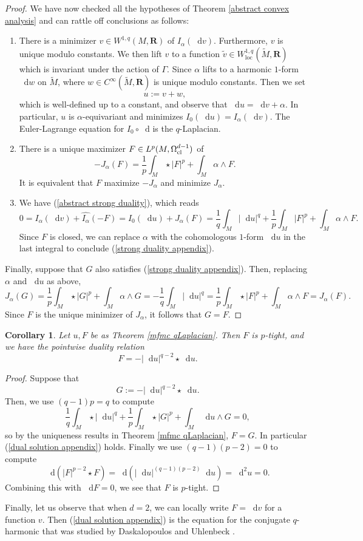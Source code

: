 \documentclass[reqno,11pt]{amsart}
\newcommand{\RR}{\mathbf{R}}
\newcommand*\dif{\mathop{}\!\mathrm{d}}
\newcommand{\loc}{\mathrm{loc}}
\newtheorem{corollary}[theorem]{Corollary}
\theoremstyle{definition}
\numberwithin{equation}{section}
\begin{document}
\begin{proof}
We have now checked all the hypotheses of Theorem \ref{abstract convex analysis} and can rattle off conclusions as follows:
\begin{enumerate}
\item There is a minimizer $v \in W^{1, q}(M, \RR)$ of $I_\alpha(\dif v)$. Furthermore, $v$ is unique modulo constants.
We then lift $v$ to a function $\tilde v \in W^{1, q}_\loc(\tilde M, \RR)$ which is invariant under the action of $\Gamma$.
Since $\alpha$ lifts to a harmonic $1$-form $\dif w$ on $\tilde M$, where $w \in C^\infty(\tilde M, \RR)$ is unique modulo constants.
Then we set 
$$u := v + w,$$
which is well-defined up to a constant, and observe that $\dif u = \dif v + \alpha$.
In particular, $u$ is $\alpha$-equivariant and minimizes $I_0(\dif u) = I_\alpha(\dif v)$.
The Euler-Lagrange equation for $I_0 \circ \dif$ is the $q$-Laplacian.
\item There is a unique maximizer $F \in L^p(M, \Omega^{d - 1}_{\rm cl})$ of
$$-J_\alpha(F) = \frac{1}{p} \int_M \star |F|^p + \int_M \alpha \wedge F.$$
It is equivalent that $F$ maximize $-J_\alpha$ and minimize $J_\alpha$.
\item We have (\ref{abstract strong duality}), which reads 
$$0 = I_\alpha(\dif v) + \widehat{I_\alpha}(-F) = I_0(\dif u) + J_\alpha(F) = \frac{1}{q} \int_M |\dif u|^q + \frac{1}{p} \int_M |F|^p + \int_M \alpha \wedge F.$$
Since $F$ is closed, we can replace $\alpha$ with the cohomologous $1$-form $\dif u$ in the last integral to conclude (\ref{strong duality appendix}).
\end{enumerate}

Finally, suppose that $G$ also satisfies (\ref{strong duality appendix}).
Then, replacing $\alpha$ and $\dif u$ as above,
$$J_\alpha(G) = \frac{1}{p} \int_M \star |G|^p + \int_M \alpha \wedge G = -\frac{1}{q} \int_M |\dif u|^q = \frac{1}{p} \int_M \star |F|^p + \int_M \alpha \wedge F = J_\alpha(F).$$
Since $F$ is the unique minimizer of $J_\alpha$, it follows that $G = F$.
\end{proof}

\begin{corollary}
Let $u, F$ be as Theorem \ref{mfmc qLaplacian}.
Then $F$ is $p$-tight, and we have the pointwise duality relation
\begin{equation}\label{dual solution appendix}
F = -|\dif u|^{q - 2} \star \dif u.
\end{equation}
\end{corollary}
\begin{proof}
Suppose that
$$G := -|\dif u|^{q - 2} \star \dif u.$$
Then, we use $(q - 1)p = q$ to compute
$$\frac{1}{q} \int_M \star |\dif u|^q + \frac{1}{p} \int_M \star |G|^p + \int_M \dif u \wedge G = 0,$$
so by the uniqueness results in Theorem \ref{mfmc qLaplacian}, $F = G$.
In particular (\ref{dual solution appendix}) holds.
Finally we use $(q - 1)(p - 2) = 0$ to compute 
$$\dif(|F|^{p - 2} \star F) = \dif(|\dif u|^{(q - 1)(p - 2)} \dif u) = \dif^2 u = 0.$$
Combining this with $\dif F = 0$, we see that $F$ is $p$-tight.
\end{proof}

Finally, let us observe that when $d = 2$, we can locally write $F = \dif v$ for a function $v$.
Then (\ref{dual solution appendix}) is the equation for the conjugate $q$-harmonic that was studied by Daskalopoulos and Uhlenbeck \cite[\S3]{daskalopoulos2020transverse}.



\printbibliography
\end{document}
